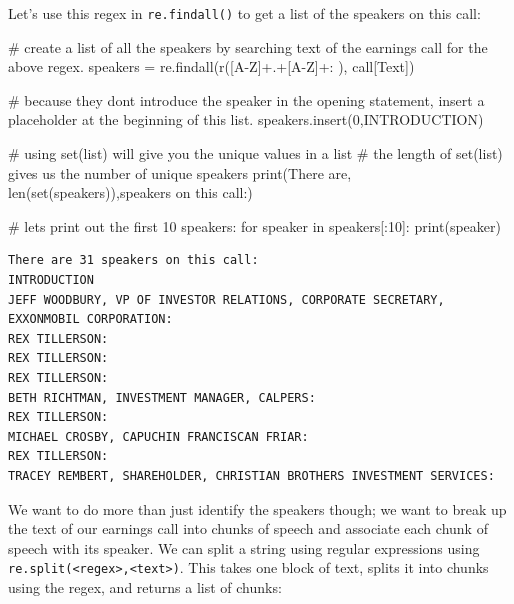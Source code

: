 \documentclass[
  letterpaper,
  DIV=11,
  numbers=noendperiod]{scrreprt}
\newenvironment{Shaded}{\begin{snugshade}}{\end{snugshade}}
\newcommand{\BuiltInTok}[1]{\textcolor[rgb]{0.00,0.23,0.31}{#1}}
\newcommand{\CommentTok}[1]{\textcolor[rgb]{0.37,0.37,0.37}{#1}}
\newcommand{\ControlFlowTok}[1]{\textcolor[rgb]{0.00,0.23,0.31}{#1}}
\newcommand{\DecValTok}[1]{\textcolor[rgb]{0.68,0.00,0.00}{#1}}
\newcommand{\KeywordTok}[1]{\textcolor[rgb]{0.00,0.23,0.31}{#1}}
\newcommand{\NormalTok}[1]{\textcolor[rgb]{0.00,0.23,0.31}{#1}}
\newcommand{\OperatorTok}[1]{\textcolor[rgb]{0.37,0.37,0.37}{#1}}
\newcommand{\StringTok}[1]{\textcolor[rgb]{0.13,0.47,0.30}{#1}}
\newcommand{\VerbatimStringTok}[1]{\textcolor[rgb]{0.13,0.47,0.30}{#1}}
\begin{document}
Let's use this regex in \texttt{re.findall()} to get a list of the
speakers on this call:

\begin{Shaded}
\begin{Highlighting}[]
\CommentTok{\# create a list of all the speakers by searching text of the earnings call for the above regex. }
\NormalTok{speakers }\OperatorTok{=}\NormalTok{ re.findall(}\VerbatimStringTok{r\textquotesingle{}([A{-}Z]+.+[A{-}Z]+: )\textquotesingle{}}\NormalTok{, call[}\StringTok{\textquotesingle{}Text\textquotesingle{}}\NormalTok{])}

\CommentTok{\# because they don\textquotesingle{}t introduce the speaker in the opening statement, insert a placeholder at the beginning of this list.}
\NormalTok{speakers.insert(}\DecValTok{0}\NormalTok{,}\StringTok{\textquotesingle{}INTRODUCTION\textquotesingle{}}\NormalTok{)}

\CommentTok{\# using set(list) will give you the unique values in a list}
\CommentTok{\# the length of set(list) gives us the number of unique speakers }
\BuiltInTok{print}\NormalTok{(}\StringTok{\textquotesingle{}There are\textquotesingle{}}\NormalTok{, }\BuiltInTok{len}\NormalTok{(}\BuiltInTok{set}\NormalTok{(speakers)),}\StringTok{\textquotesingle{}speakers on this call:\textquotesingle{}}\NormalTok{)}

\CommentTok{\# let\textquotesingle{}s print out the first 10 speakers: }
\ControlFlowTok{for}\NormalTok{ speaker }\KeywordTok{in}\NormalTok{ speakers[:}\DecValTok{10}\NormalTok{]:}
  \BuiltInTok{print}\NormalTok{(speaker)}
\end{Highlighting}
\end{Shaded}

\begin{verbatim}
There are 31 speakers on this call:
INTRODUCTION
JEFF WOODBURY, VP OF INVESTOR RELATIONS, CORPORATE SECRETARY, EXXONMOBIL CORPORATION: 
REX TILLERSON: 
REX TILLERSON: 
REX TILLERSON: 
BETH RICHTMAN, INVESTMENT MANAGER, CALPERS: 
REX TILLERSON: 
MICHAEL CROSBY, CAPUCHIN FRANCISCAN FRIAR: 
REX TILLERSON: 
TRACEY REMBERT, SHAREHOLDER, CHRISTIAN BROTHERS INVESTMENT SERVICES: 
\end{verbatim}

We want to do more than just identify the speakers though; we want to
break up the text of our earnings call into chunks of speech and
associate each chunk of speech with its speaker. We can split a string
using regular expressions using
\texttt{re.split(\textless{}regex\textgreater{},\textless{}text\textgreater{})}.
This takes one block of text, splits it into chunks using the regex, and
returns a list of chunks:
\end{document}

